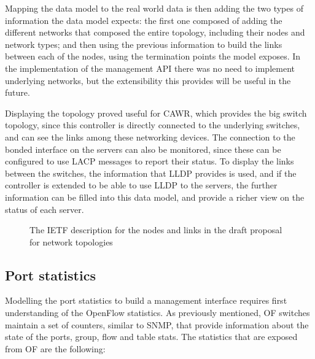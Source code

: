 \par Mapping the data model to the real world data is then adding the two types of information the data model expects: the first one composed of adding the different networks that composed the entire topology, including their
nodes and network types; and then using the previous information to build the links between each of the nodes, using the termination points the model exposes. In the implementation of the management API there was no need to implement 
underlying networks, but the extensibility this provides will be useful in the future.

\par Displaying the topology proved useful for CAWR, which provides the big switch topology, since this controller is directly connected to the underlying switches, and can see the links among these networking devices. The connection
to the bonded interface on the servers can also be monitored, since these can be configured to use LACP messages to report their status. To display the links between the switches, the information that LLDP provides is used, 
and if the controller is extended to be able to use LLDP to the servers, the further information can be filled into this data model, and provide a richer view on the status of each server.

\begin{figure} [h]
    \begin{subfigure}
    \texttt{[image: bisdn/ietf\_link]}
    \end{subfigure}
    \begin{subfigure}
    \texttt{[image: bisdn/ietf\_node]}
    \end{subfigure}
\caption{The IETF description for the nodes and links in the draft proposal for network topologies \cite {CITE - https://www.ietf.org/id/draft-ietf-i2rs-yang-network-topo-20.txt} }
\end{figure}

\subsection {Port statistics}

\par Modelling the port statistics to build a management interface requires first understanding of the OpenFlow statistics. As previously mentioned, OF switches maintain a set of counters, similar to SNMP, that provide information 
about the state of the ports, group, flow and table stats. The statistics that are exposed from OF are the following:

